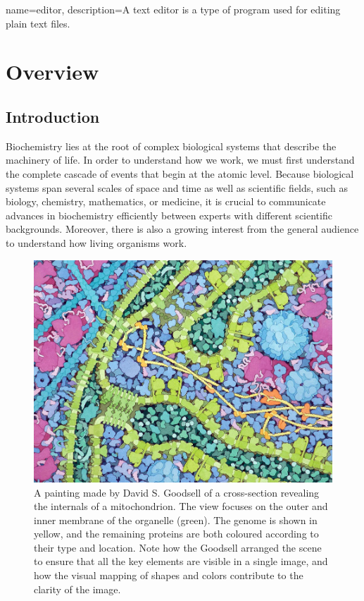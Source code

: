 
{
	name={editor},
	description={A text editor is a type of program used for editing plain text files.}
}

\part{Overview}

\chapter{Introduction}

Biochemistry lies at the root of complex biological systems that describe the machinery of life.
In order to understand how we work, we must first understand the complete cascade of events that begin at the atomic level.
Because biological systems span several scales of space and time as well as scientific fields, such as biology, chemistry, mathematics, or medicine, it is crucial to communicate advances in biochemistry efficiently between experts with different scientific backgrounds.
Moreover, there is also a growing interest from the general audience to understand how living organisms work.

\begin{figure}
	\centering
	\includegraphics[width=0.80\linewidth]{graphics/goodsell_mitochondrion}
	\caption{A painting made by David S. Goodsell of a cross-section revealing the internals of a mitochondrion. The view focuses on the outer and inner membrane of the organelle (green). The genome is shown in yellow, and the remaining proteins are both coloured according to their type and location. Note how the Goodsell arranged the scene to ensure that all the key elements are visible in a single image, and how the visual mapping of shapes and colors contribute to the clarity of the image.}
	\label{fig:david-s}
\end{figure}

